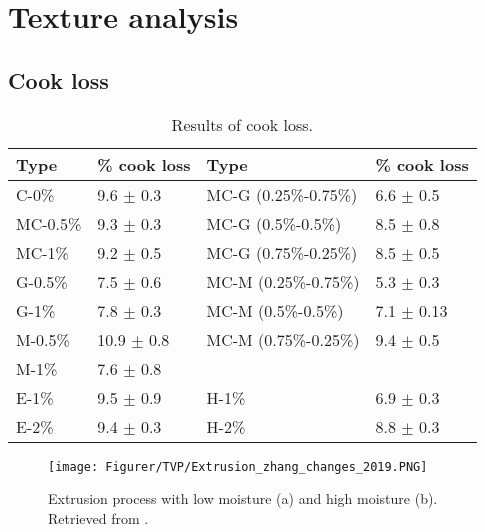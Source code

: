 \section{Texture analysis}

\subsection{Cook loss}
\begin{table}[H]
    \caption{Results of cook loss.}
    \centering
    \begin{tabular}{llll}
\toprule

\textbf{Type} & \textbf{\% cook loss} & \textbf{Type} & \textbf{\% cook loss}\\

\hline

C-0\%       & 9.6 $\pm$ 0.3  & MC-G (0.25\%-0.75\%)     & 6.6 $\pm$ 0.5 \\
MC-0.5\%    & 9.3 $\pm$ 0.3  & MC-G (0.5\%-0.5\%)       & 8.5 $\pm$ 0.8 \\
MC-1\%      & 9.2 $\pm$ 0.5  & MC-G (0.75\%-0.25\%)     & 8.5 $\pm$ 0.5 \\
G-0.5\%     & 7.5 $\pm$ 0.6  & MC-M (0.25\%-0.75\%)     & 5.3 $\pm$ 0.3 \\
G-1\%       & 7.8 $\pm$ 0.3  & MC-M (0.5\%-0.5\%)       & 7.1 $\pm$ 0.13 \\
M-0.5\%     & 10.9 $\pm$ 0.8 & MC-M (0.75\%-0.25\%)     & 9.4 $\pm$ 0.5 \\ 
M-1\%       & 7.6 $\pm$ 0.8  \\
E-1\%       & 9.5 $\pm$ 0.9  & H-1\%       & 6.9 $\pm$ 0.3  \\
E-2\%       & 9.4 $\pm$ 0.3 & H-2\%       & 8.8 $\pm$ 0.3  \\

\bottomrule

    \end{tabular}%
    \label{tab:ProximateAnalyis:CookLoss}
\end{table}

\begin{figure}[H]
    \centering
    \texttt{[image: Figurer/TVP/Extrusion\_zhang\_changes\_2019.PNG]}
    \caption{Extrusion process with low moisture (a) and high moisture (b). Retrieved from \cite{zhang_changes_2019}.}
    \label{fig:Extrusion_zhang_changes_2019}
\end{figure}

